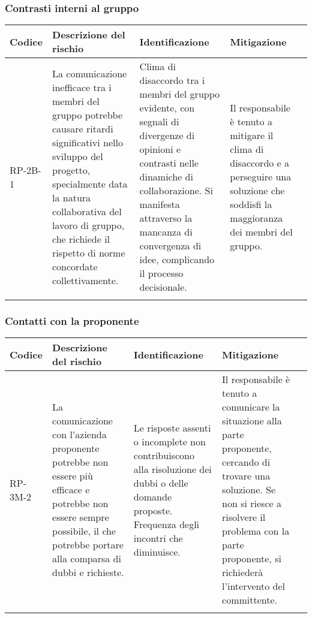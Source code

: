 \subsubsection{Contrasti interni al gruppo}
\begin{table}[h]
    \centering
    \begin{tabularx}{\textwidth}{l>{\RaggedRight}X>{\RaggedRight}X>{\RaggedRight}X>{\RaggedRight}X}
    \toprule
    \rowcolor{gray!50}
    \textbf{Codice} & \textbf{Descrizione del rischio} & \textbf{Identificazione} & \textbf{Mitigazione} \\
    \midrule
    \addlinespace 
    RP-2B-1 & 
    La comunicazione inefficace tra i membri del gruppo potrebbe causare ritardi significativi nello sviluppo del progetto, specialmente data la natura collaborativa del lavoro di gruppo, che richiede il rispetto di norme concordate collettivamente.& 
    Clima di disaccordo tra i membri del gruppo evidente, con segnali di divergenze di opinioni e contrasti nelle dinamiche di collaborazione. Si manifesta attraverso la mancanza di convergenza di idee, complicando il processo decisionale. &
    Il responsabile è tenuto a mitigare il clima di disaccordo e a perseguire una soluzione che soddisfi la maggioranza dei membri del gruppo. \\
    \bottomrule
    \addlinespace 
    \end{tabularx}
\end{table}

\newpage
\subsubsection{Contatti con la proponente}
\begin{table}[h]
    \centering
    \begin{tabularx}{\textwidth}{l>{\RaggedRight}X>{\RaggedRight}X>{\RaggedRight}X>{\RaggedRight}X}
    \toprule
    \rowcolor{gray!50}
    \textbf{Codice} & \textbf{Descrizione del rischio} & \textbf{Identificazione} & \textbf{Mitigazione} \\
    \midrule
    \addlinespace 
    RP-3M-2 & 
    La comunicazione con l'azienda proponente potrebbe non essere più efficace e potrebbe non essere sempre possibile, il che potrebbe portare alla comparsa di dubbi e richieste. & 
    Le risposte assenti o incomplete non contribuiscono alla risoluzione dei dubbi o delle domande proposte. Frequenza degli incontri che diminuisce.&
    Il responsabile è tenuto a comunicare la situazione alla parte proponente, cercando di trovare una soluzione. Se non si riesce a risolvere il problema con la parte proponente, si richiederà l’intervento del committente. \\
    \bottomrule
    \addlinespace 
    \end{tabularx}
\end{table}
